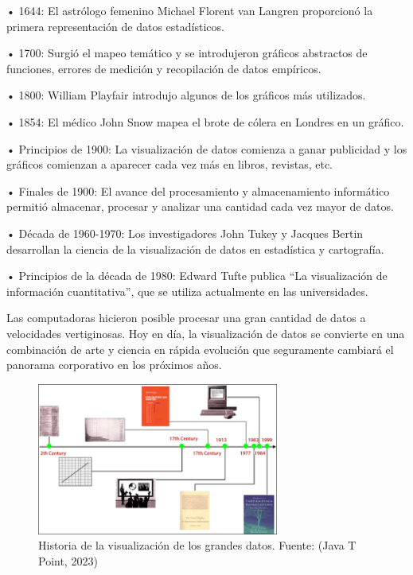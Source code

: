 \documentclass[
  11pt,
  bookmarksnumbered]{article}
\begin{document}
• 1644: El astrólogo femenino Michael Florent van Langren proporcionó la primera representación de datos estadísticos.

• 1700: Surgió el mapeo temático y se introdujeron gráficos abstractos de funciones, errores de medición y recopilación de datos empíricos.

• 1800: William Playfair introdujo algunos de los gráficos más utilizados.

• 1854: El médico John Snow mapea el brote de cólera en Londres en un gráfico.

• Principios de 1900: La visualización de datos comienza a ganar publicidad y los gráficos comienzan a aparecer cada vez más en libros, revistas, etc.

• Finales de 1900: El avance del procesamiento y almacenamiento informático permitió almacenar, procesar y analizar una cantidad cada vez mayor de datos.

• Década de 1960-1970: Los investigadores John Tukey y Jacques Bertin desarrollan la ciencia de la visualización de datos en estadística y cartografía.

• Principios de la década de 1980: Edward Tufte publica ``La visualización de información cuantitativa'', que se utiliza actualmente en las universidades.

Las computadoras hicieron posible procesar una gran cantidad de datos a velocidades vertiginosas.
Hoy en día, la visualización de datos se convierte en una combinación de arte y ciencia en rápida evolución que seguramente cambiará el panorama corporativo en los próximos años.

\begin{figure}

{\centering \includegraphics[width=3.13in]{media/image4} 

}

\caption{Historia de la visualización de los grandes datos. Fuente: (Java T Point, 2023)}\label{fig:unnamed-chunk-3}
\end{figure}
\end{document}
